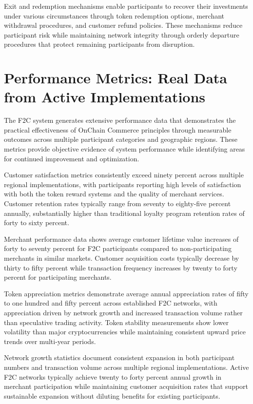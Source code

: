 \documentclass[
  Letterpaper,
]{scrbook}
\begin{document}
Exit and redemption mechanisms enable participants to recover their
investments under various circumstances through token redemption
options, merchant withdrawal procedures, and customer refund policies.
These mechanisms reduce participant risk while maintaining network
integrity through orderly departure procedures that protect remaining
participants from disruption.

\section{Performance Metrics: Real Data from Active
Implementations}\label{performance-metrics-real-data-from-active-implementations}

The F2C system generates extensive performance data that demonstrates
the practical effectiveness of OnChain Commerce principles through
measurable outcomes across multiple participant categories and
geographic regions. These metrics provide objective evidence of system
performance while identifying areas for continued improvement and
optimization.

Customer satisfaction metrics consistently exceed ninety percent across
multiple regional implementations, with participants reporting high
levels of satisfaction with both the token reward systems and the
quality of merchant services. Customer retention rates typically range
from seventy to eighty-five percent annually, substantially higher than
traditional loyalty program retention rates of forty to sixty percent.

Merchant performance data shows average customer lifetime value
increases of forty to seventy percent for F2C participants compared to
non-participating merchants in similar markets. Customer acquisition
costs typically decrease by thirty to fifty percent while transaction
frequency increases by twenty to forty percent for participating
merchants.

Token appreciation metrics demonstrate average annual appreciation rates
of fifty to one hundred and fifty percent across established F2C
networks, with appreciation driven by network growth and increased
transaction volume rather than speculative trading activity. Token
stability measurements show lower volatility than major cryptocurrencies
while maintaining consistent upward price trends over multi-year
periods.

Network growth statistics document consistent expansion in both
participant numbers and transaction volume across multiple regional
implementations. Active F2C networks typically achieve twenty to forty
percent annual growth in merchant participation while maintaining
customer acquisition rates that support sustainable expansion without
diluting benefits for existing participants.
\end{document}
